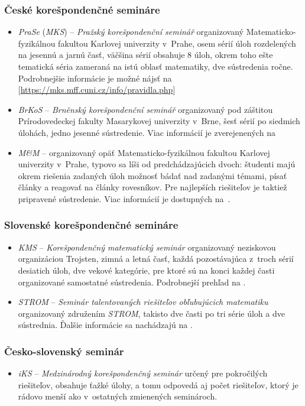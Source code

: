\subsubsection{České korešpondenčné semináre}
\begin{itemize}
\item \textit{PraSe} (\textit{MKS}) -- \textit{Pražský korešpondenční seminář} organizovaný Matematicko-fyzikálnou fakultou  Karlovej univerzity v~Prahe, osem sérií úloh rozdelených na jesennú a jarnú časť, väčšina sérií obsahuje 8 úloh, okrem toho ešte tematická séria zameraná na istú oblasť matematiky, dve sústredenia ročne. Podrobnejšie informácie je možné nájsť na [\url{https://mks.mff.cuni.cz/info/pravidla.php}]
\item \textit{BrKoS} -- \textit{Brněnský korešpondenční seminář} organizovaný pod záštitou Prírodovedeckej fakulty Masarykovej univerzity v~Brne, šesť sérií po siedmich úlohách, jedno jesenné sústredenie. Viac informácií je zverejenených na \cite{brkos}
\item \textit{M\&M} -- organizovaný opäť Matematicko-fyzikálnou fakultou Karlovej univerzity v~Prahe, typovo sa líši od predchádzajúcich dvoch: študenti majú okrem riešenia zadaných úloh možnosť bádať nad zadanými témami, písať články a reagovať na články rovesníkov. Pre najlepších riešiteľov je taktiež pripravené sústredenie. Viac informácií je dostupných na~\cite{mam}.
\end{itemize}

\subsubsection{Slovenské korešpondenčné semináre}
\begin{itemize}
\item \textit{KMS} -- \textit{Korešpondenčný matematický seminár} organizovaný neziskovou organizáciou Trojsten, zimná a letná časť, každá pozostávajúca z~troch sérií desiatich úloh, dve vekové kategórie, pre ktoré sú na konci každej časti organizované samostatné sústredenia. Podrobnejší prehľad na \cite{kms}.
\item \textit{STROM} -- \textit{Seminár talentovaných riešiteľov obľubujúcich matematiku} organizovaný združením \textit{STROM}, takisto dve časti po tri série úloh a dve sústrednia. Ďalšie informácie sa nachádzajú na \cite{strom}.
\end{itemize}

\subsubsection*{Česko-slovenský seminár}
\begin{itemize}
\item \textit{iKS} -- \textit{Medzinárodný korešpondenčný seminár} určený pre pokročilých riešiteľov, obsahuje ťažké úlohy, a tomu odpovedá aj počet riešiteľov, ktorý je rádovo menší ako v~ostatných zmienených seminároch.
\end{itemize}

